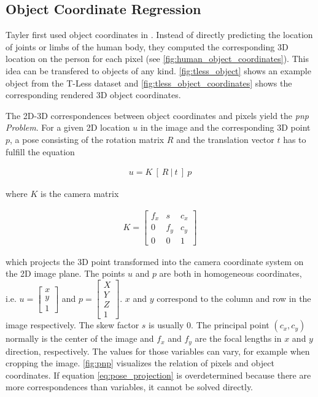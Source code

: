 \subsection{Object Coordinate Regression} \label{objectcoordinates}

Tayler \etal first used object coordinates in \cite{tsharp}. Instead of directly predicting the location of joints or limbs of the human body, they computed the corresponding 3D location on the person for each pixel (see \fig \ref{fig:human_object_coordinates}). This idea can be transfered to objects of any kind. \fig \ref{fig:tless_object} shows an example object from the T-Less dataset \cite{tless} and \fig \ref{fig:tless_object_coordinates} shows the corresponding rendered 3D object coordinates.

The 2D-3D correspondences between object coordinates and pixels yield the \textit{\ac{pnp} Problem}. For a given 2D location $u$ in the image and the corresponding 3D point $p$, a pose consisting of the rotation matrix $R$ and the translation vector $t$ has to fulfill the equation

\begin{align}
 u = K \ [ \ R \ | \ t \ ] \ p \label{eq:pose_projection}
\end{align} 
 
\noindent where $K$ is the camera matrix

\begin{align}
K = \begin{bmatrix}
f_x & s & c_x \\
0 & f_y & c_y \\
0 & 0 & 1 
\end{bmatrix}
\end{align}

\noindent which projects the 3D point transformed into the camera coordinate system on the 2D image plane. The points $u$ and $p$ are both in homogeneous coordinates, i.e. $u = \begin{bmatrix} x \\ y \\ 1 \end{bmatrix}$ and $p = \begin{bmatrix} X \\ Y \\ Z \\ 1 \end{bmatrix}$. $x$ and $y$ correspond to the column and row in the image respectively. The skew factor $s$ is usually $0$. The principal point $(c_x, c_y)$ normally is the center of the image and $f_x$ and $f_y$ are the focal lengths in $x$ and $y$ direction, respectively. The values for those variables can vary, for example when cropping the image. \fig \ref{fig:pnp} visualizes the relation of pixels and object coordinates. If equation \ref{eq:pose_projection} is overdetermined because there are more correspondences than variables, it cannot be solved directly.

